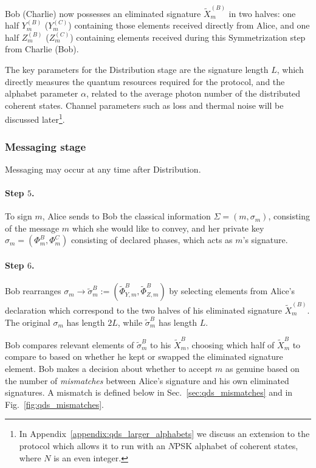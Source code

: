 Bob (Charlie) now possesses an eliminated signature $\tilde{X}_m^{\left(B\right)}$ in two halves: one half $Y_m^{\left(B\right)}$ ($Y_m^{\left(C\right)}$) containing those elements received directly from Alice, and one half $Z_m^{\left(B\right)}$ ($Z_m^{\left(C\right)}$) containing elements received during this Symmetrization step from Charlie (Bob).

The key parameters for the Distribution stage are the signature length $L$, which directly measures the quantum resources required for the protocol, and the alphabet parameter $\alpha$, related to the average photon number of the distributed coherent states. Channel parameters such as loss and thermal noise will be discussed later\footnote{In Appendix~\ref{appendix:qds_larger_alphabets} we discuss an extension to the protocol which allows it to run with an $N$PSK alphabet of coherent states, where $N$ is an even integer.}.


\subsubsection{Messaging stage}

Messaging may occur at any time after Distribution.

\paragraph{Step $5$.}
To sign $m$, Alice sends to Bob the classical information $\Sigma = \left(m, \sigma_m\right)$, consisting of the message $m$ which she would like to convey, and her private key $\sigma_m = \left(\Phi_m^B, \Phi_m^C\right)$ consisting of declared phases, which acts as $m$'s signature. 


\paragraph{Step $6$.} Bob rearranges $\sigma_m \rightarrow \tilde{\sigma}_m^B := \left(\tilde{\Phi}_{Y, m}^B, \tilde{\Phi}_{Z, m}^B\right)$ by selecting elements from Alice's declaration which correspond to the two halves of his eliminated signature $\tilde{X}_m^{\left(B\right)}$. The original $\sigma_m$ has length $2 L$, while $\tilde{\sigma}_m^B$ has length $L$.

Bob compares relevant elements of $\tilde{\sigma}_m^B$ to his $\tilde{X}_m^{B}$, choosing which half of $\tilde{X}_m^B$ to compare to based on whether he kept or swapped the eliminated signature element. Bob makes a decision about whether to accept $m$ as genuine based on the number of \emph{mismatches} between Alice's signature and his own eliminated signatures. A mismatch is defined below in Sec.~\ref{sec:qds_mismatches} and in Fig.~\ref{fig:qds_mismatches}.


